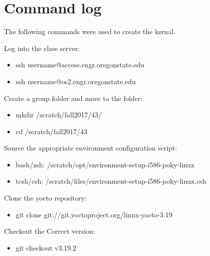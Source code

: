 \documentclass[letterpaper,onecolumn,10pt,titlepage]{IEEEtran}
\begin{document}
\section{Command log}
\par
The following commands were used to create the kernal.\\
\par
Log into the class server:\\ 
\begin{itemize}
    \item ssh username@access.engr.oregonstate.edu\\
    \item ssh username@os2.engr.oregonstate.edu\\
\end{itemize}
\par
Create a group folder and move to the folder:\\
\begin{itemize}
    \item mkdir /scratch/fall2017/43/\\
    \item cd /scratch/fall2017/43\\
\end{itemize}
\par
Source the appropriate environment configuration script:\\
\begin{itemize}
    \item bash/zsh: /scratch/opt/environment-setup-i586-poky-linux\\
    \item tcsh/csh: /scratch/files/environment-setup-i586-poky-linux.csh\\
\end{itemize}
\par
Clone the yocto repository:\\
\begin{itemize}
    \item git clone git://git.yoctoproject.org/linux-yocto-3.19\\
\end{itemize}
\par
Checkout the Correct version:\\
\begin{itemize}
	\item git checkout v3.19.2\\
\end{itemize}
\end{document}
